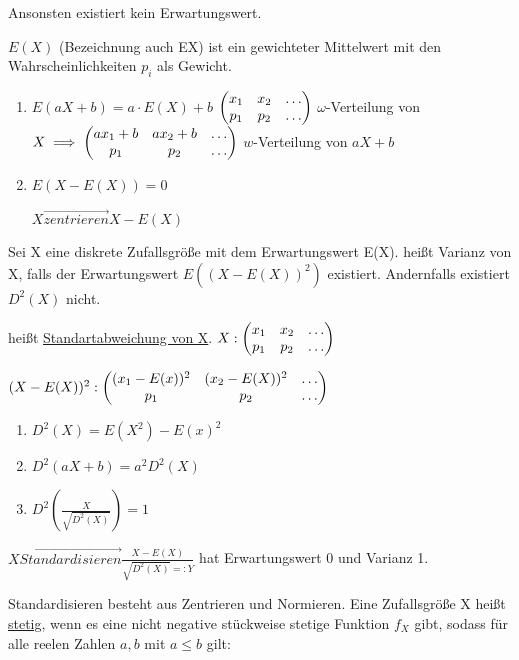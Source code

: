 \documentclass{../tudscript}
\begin{document}
Ansonsten existiert kein Erwartungswert.

$E(X)$ (Bezeichnung auch EX) ist ein gewichteter Mittelwert mit den Wahrscheinlichkeiten $p_i$ als Gewicht.

\begin{enumerate}
    \item $E(aX + b) = a \cdot E(X) + b$
    $\begin{pmatrix} x_1 & x_2 & \ldots\\ p_1 & p_2 & \ldots \end{pmatrix}$ $\omega$-Verteilung von $X \implies \begin{pmatrix} a x_1 + b & a x_2 + b & \ldots \\ p_1 & p_2 & \ldots \end{pmatrix}$ $w$-Verteilung von $a X + b$

    \item $E (X - E (X)) = 0$
    
    $X \overset{\longrightarrow}{zentrieren} X - E(X)$

\end{enumerate}

Sei X eine diskrete Zufallsgröße mit dem Erwartungswert E(X).
heißt Varianz von X, falls der Erwartungswert $E((X - E(X))^2)$ existiert. Andernfalls existiert $D^2 (X)$ nicht.

heißt \underline{Standartabweichung von X}.
$X: \begin{pmatrix} x_1 & x_2 & \ldots \\ p_1 & p_2 & \ldots \end{pmatrix}$

$(X - E(X))^2: \begin{pmatrix} (x_1 - E(x))^2 & (x_2 - E(X))^2 & \ldots \\ p_1 & p_2 & \ldots \end{pmatrix}$ 

\begin{enumerate}
\item $D^2 (X) = E(X^2) - E(x)^2$
\item $D^2(aX +b) = a^2 D^2(X)$
\item $D^2 (\frac{X}{\sqrt{D^2 (X)}}) = 1$
\end{enumerate}


$X \overset{\longrightarrow}{Standardisieren} \frac{X - E(X)}{\sqrt{D^2 (X)} =: Y }$
hat Erwartungswert 0 und Varianz 1.

Standardisieren besteht aus Zentrieren und Normieren.
Eine Zufallsgröße X heißt \underline{stetig}, wenn es eine nicht negative stückweise stetige Funktion $f_X$ gibt, sodass für alle reelen Zahlen $a, b$ mit $a \leq b$ gilt:
\end{document}
